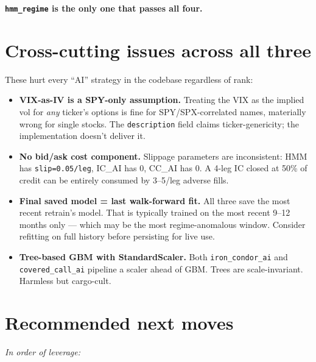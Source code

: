 \documentclass[11pt,a4paper]{article}
\begin{document}
\textbf{\texttt{hmm\_regime} is the only one that passes all four.}

\section*{Cross-cutting issues across all three}

These hurt every ``AI'' strategy in the codebase regardless of rank:

\begin{itemize}[leftmargin=*,itemsep=3pt]
  \item \textbf{VIX-as-IV is a SPY-only assumption.} Treating the VIX as the implied vol for \emph{any} ticker's options is fine for SPY/SPX-correlated names, materially wrong for single stocks. The \texttt{description} field claims ticker-genericity; the implementation doesn't deliver it.
  \item \textbf{No bid/ask cost component.} Slippage parameters are inconsistent: HMM has \texttt{slip=0.05/leg}, IC\_AI has 0, CC\_AI has 0. A 4-leg IC closed at 50\% of credit can be entirely consumed by 3--5\textcent /leg adverse fills.
  \item \textbf{Final saved model = last walk-forward fit.} All three save the most recent retrain's model. That is typically trained on the most recent 9--12 months only --- which may be the most regime-anomalous window. Consider refitting on full history before persisting for live use.
  \item \textbf{Tree-based GBM with StandardScaler.} Both \texttt{iron\_condor\_ai} and \texttt{covered\_call\_ai} pipeline a scaler ahead of GBM. Trees are scale-invariant. Harmless but cargo-cult.
\end{itemize}

\section*{Recommended next moves}

\textit{In order of leverage:}
\end{document}
